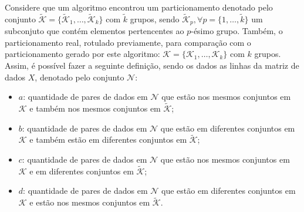 \documentclass[
    12pt,                %
    oneside,            %
    a4paper,            %
    english,            %
    brazil                %
    ]{abntex2ppgsi}
\begin{document}
Considere que um algoritmo encontrou um particionamento denotado pelo conjunto $\mathscr{\widetilde{K}} = \{\mathcal{\widetilde{K}}_1, \dots, \mathcal{\widetilde{K}}_k\}$ com $\widetilde{k}$ grupos, sendo $\mathcal{\widetilde{K}}_p, \forall p = \{1, \dots, \widetilde{k}\}$ um subconjuto que contém elementos pertencentes ao $p$-ésimo grupo.
Também, o particionamento real, rotulado previamente, para comparação com o particionamento gerado por este algoritmo: $\mathscr{K} = \{\mathcal{K}_1, \dots, \mathcal{K}_k\}$ com $k$ grupos.
Assim, é possível fazer a seguinte definição, sendo os dados as linhas da matriz de dados $X$, denotado pelo conjunto $\mathcal{N}$:
\begin{itemize}
    \item $a$: quantidade de pares de dados em $\mathcal{N}$ que estão nos mesmos conjuntos em $\mathscr{K}$ e também nos mesmos conjuntos em $\mathscr{\widetilde{K}}$;
    \item $b$: quantidade de pares de dados em $\mathcal{N}$ que estão em diferentes conjuntos em $\mathscr{K}$ e também estão em diferentes conjuntos em $\mathscr{\widetilde{K}}$;
    \item $c$: quantidade de pares de dados em $\mathcal{N}$ que estão nos mesmos conjuntos em $\mathscr{K}$ e em diferentes conjuntos em $\mathscr{\widetilde{K}}$;
    \item $d$: quantidade de pares de dados em $\mathcal{N}$ que estão em diferentes conjuntos em $\mathscr{K}$ e estão nos mesmos conjuntos em $\mathscr{\widetilde{K}}$.
\end{itemize}
\end{document}
